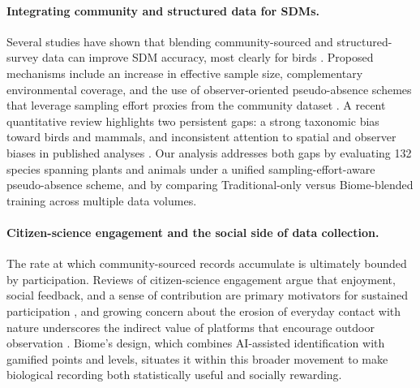 \paragraph{Integrating community and structured data for SDMs.}
Several studies have shown that blending community-sourced and structured-survey data can improve SDM accuracy, most clearly for birds \citep{johnston2018estimates,johnston2021analytical,robinson2020integrating,steen2019stringent}. Proposed mechanisms include an increase in effective sample size, complementary environmental coverage, and the use of observer-oriented pseudo-absence schemes that leverage sampling effort proxies from the community dataset \citep{milanesi2020observer}. A recent quantitative review highlights two persistent gaps: a strong taxonomic bias toward birds and mammals, and inconsistent attention to spatial and observer biases in published analyses \citep{feldman2021trends}. Our analysis addresses both gaps by evaluating 132 species spanning plants and animals under a unified sampling-effort-aware pseudo-absence scheme, and by comparing Traditional-only versus Biome-blended training across multiple data volumes.

\paragraph{Citizen-science engagement and the social side of data collection.}
The rate at which community-sourced records accumulate is ultimately bounded by participation. Reviews of citizen-science engagement argue that enjoyment, social feedback, and a sense of contribution are primary motivators for sustained participation \citep{bonney2009citizen,chandler2017contribution}, and growing concern about the erosion of everyday contact with nature underscores the indirect value of platforms that encourage outdoor observation \citep{soga2023biophobia,kendal2020citybias}. Biome's design, which combines AI-assisted identification with gamified points and levels, situates it within this broader movement to make biological recording both statistically useful and socially rewarding.
